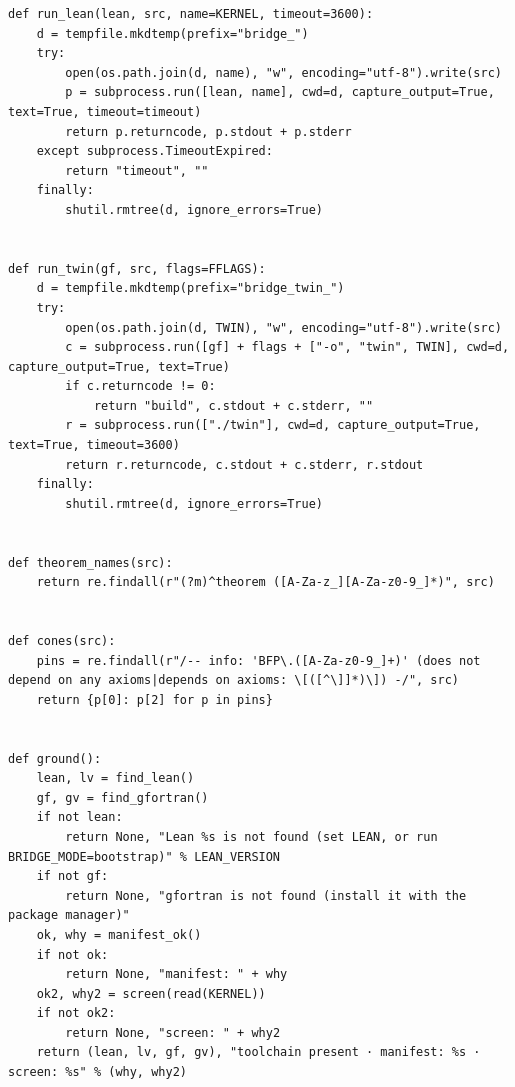 \documentclass[10pt,twocolumn]{article}
\begin{document}
\begin{Verbatim}
def run_lean(lean, src, name=KERNEL, timeout=3600):
    d = tempfile.mkdtemp(prefix="bridge_")
    try:
        open(os.path.join(d, name), "w", encoding="utf-8").write(src)
        p = subprocess.run([lean, name], cwd=d, capture_output=True, text=True, timeout=timeout)
        return p.returncode, p.stdout + p.stderr
    except subprocess.TimeoutExpired:
        return "timeout", ""
    finally:
        shutil.rmtree(d, ignore_errors=True)


def run_twin(gf, src, flags=FFLAGS):
    d = tempfile.mkdtemp(prefix="bridge_twin_")
    try:
        open(os.path.join(d, TWIN), "w", encoding="utf-8").write(src)
        c = subprocess.run([gf] + flags + ["-o", "twin", TWIN], cwd=d, capture_output=True, text=True)
        if c.returncode != 0:
            return "build", c.stdout + c.stderr, ""
        r = subprocess.run(["./twin"], cwd=d, capture_output=True, text=True, timeout=3600)
        return r.returncode, c.stdout + c.stderr, r.stdout
    finally:
        shutil.rmtree(d, ignore_errors=True)


def theorem_names(src):
    return re.findall(r"(?m)^theorem ([A-Za-z_][A-Za-z0-9_]*)", src)


def cones(src):
    pins = re.findall(r"/-- info: 'BFP\.([A-Za-z0-9_]+)' (does not depend on any axioms|depends on axioms: \[([^\]]*)\]) -/", src)
    return {p[0]: p[2] for p in pins}


def ground():
    lean, lv = find_lean()
    gf, gv = find_gfortran()
    if not lean:
        return None, "Lean %s is not found (set LEAN, or run BRIDGE_MODE=bootstrap)" % LEAN_VERSION
    if not gf:
        return None, "gfortran is not found (install it with the package manager)"
    ok, why = manifest_ok()
    if not ok:
        return None, "manifest: " + why
    ok2, why2 = screen(read(KERNEL))
    if not ok2:
        return None, "screen: " + why2
    return (lean, lv, gf, gv), "toolchain present · manifest: %s · screen: %s" % (why, why2)



\end{Verbatim}
\end{document}
